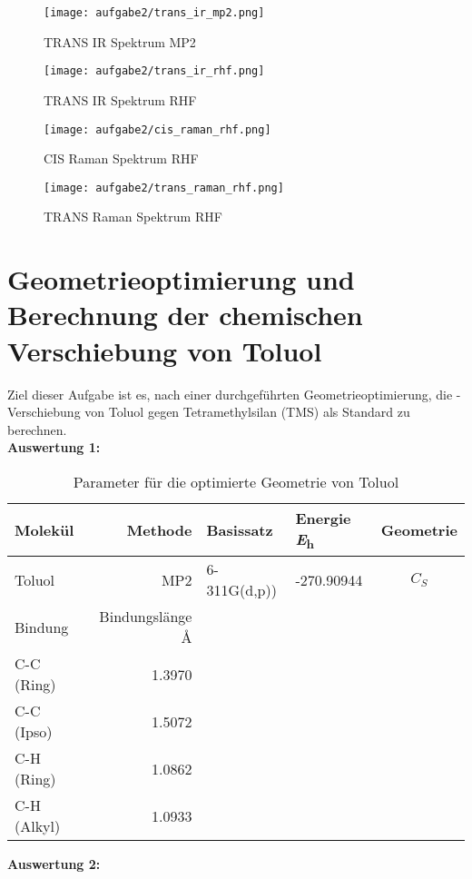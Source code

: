 \documentclass[12pt]{article}
\begin{document}
\begin{onehalfspace}
\begin{figure}[!htpb]
\centering
  \texttt{[image: aufgabe2/trans\_ir\_mp2.png]}%
  \caption{TRANS IR Spektrum MP2}
\end{figure}

\begin{figure}[!htpb]
\centering
  \texttt{[image: aufgabe2/trans\_ir\_rhf.png]}%
  \caption{TRANS IR Spektrum RHF}
\end{figure}


\begin{figure}[!htpb]
\centering
  \texttt{[image: aufgabe2/cis\_raman\_rhf.png]}%
  \caption{CIS Raman Spektrum RHF}
\end{figure}

\begin{figure}[!htpb]
\centering
  \texttt{[image: aufgabe2/trans\_raman\_rhf.png]}%
  \caption{TRANS Raman Spektrum RHF}
\end{figure}
\section{Geometrieoptimierung und Berechnung der chemischen Verschiebung von Toluol}
Ziel dieser Aufgabe ist es, nach einer durchgeführten Geometrieoptimierung, die -Verschiebung von Toluol gegen Tetramethylsilan (TMS) als Standard zu berechnen.\\
\textbf{Auswertung 1:}\\

\begin{table}[!htpb]
\centering
\caption{ Parameter für die optimierte Geometrie von Toluol}
\begin{tabular}{lrllc}
\toprule
Molekül  & Methode & Basissatz & Energie \si{\hartree} & Geometrie \\
\midrule
 Toluol & MP2 & 6-311G(d,p))& -270.90944 &$C _S$\\
\midrule
 Bindung & Bindungslänge \si{\angstrom} & &  &\\
 C-C (Ring) & 1.3970 &&&\\
 C-C (Ipso) & 1.5072 &&&\\
 C-H (Ring) & 1.0862 &&&\\
 C-H (Alkyl)& 1.0933 &&&\\
\bottomrule
\end{tabular}
\end{table}

\textbf{Auswertung 2:}\\


\end{onehalfspace}
\end{document}
